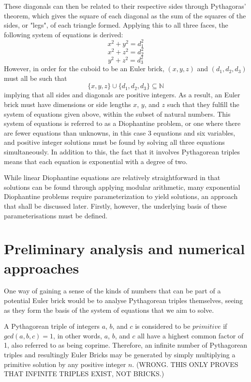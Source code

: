 \documentclass[11pt]{article}
\begin{document}
These diagonals can then be related to their respective sides through Pythagoras' theorem, which gives the square of each diagonal as the sum of the squares of the sides, or "legs", of each triangle formed. Applying this to all three faces, the following system of equations is derived:
$$x^2+y^2=d_1^2$$
$$x^2+z^2=d_2^2$$
$$y^2+z^2=d_3^2$$
However, in order for the cuboid to be an Euler brick, $(x, y, z)$ and $(d_1, d_2, d_3)$ must all be such that 
$${\{x, y, z\}}\cup{\{d_1, d_2, d_3\}}\subseteq{\mathbb{N}}$$
implying that all sides and diagonals are positive integers.
As a result, an Euler brick must have dimensions or side lengths $x$, $y$, and $z$ such that they fulfill the system of equations given above, within the subset of natural numbers. This system of equations is referred to as a Diophantine problem, or one where there are fewer equations than unknowns, in this case 3 equations and six variables, and positive integer solutions must be found by solving all three equations simultaneously. In addition to this, the fact that it involves Pythagorean triples means that each equation is exponential with a degree of two.

While linear Diophantine equations are relatively straightforward in that solutions can be found through applying modular arithmetic, many exponential Diophantine problems require parameterization to yield solutions, an approach that shall be discussed later. Firstly, however, the underlying basis of these parameterisations must be defined.

\section{Preliminary analysis and numerical approaches}
One way of gaining a sense of the kinds of numbers that can be part of a potential Euler brick would be to analyse Pythagorean triples themselves, seeing as they form the basis of the system of equations that we aim to solve.

A Pythagorean triple of integers $a$, $b$, and $c$ is considered to be $primitive$ if $gcd(a, b, c)=1$, in other words, $a$, $b$, and $c$ all have a highest common factor of 1, also referred to as being coprime. Therefore, an infinite number of Pythagorean triples and resultingly Euler Bricks may be generated by simply multiplying a primitive solution by any positive integer $n$. (WRONG. THIS ONLY PROVES THAT INFINITE TRIPLES EXIST, NOT BRICKS.)
\end{document}
